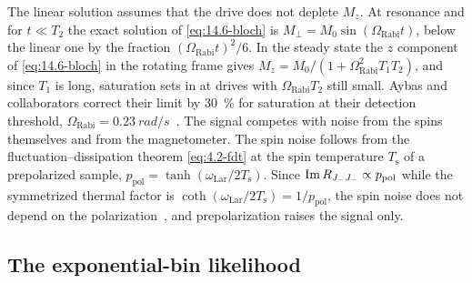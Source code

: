 The linear solution assumes that the drive does not deplete $M_z$. At resonance and for $t \ll T_2$ the exact solution of \cref{eq:14.6-bloch} is $M_\perp = M_0\sin(\Omega_{\mathrm{Rabi}}t)$, below the linear one by the fraction $(\Omega_{\mathrm{Rabi}}t)^2/6$. In the steady state the $z$ component of \cref{eq:14.6-bloch} in the rotating frame gives $M_z = M_0/(1 + \Omega_{\mathrm{Rabi}}^2T_1T_2)$, and since $T_1$ is long, saturation sets in at drives with $\Omega_{\mathrm{Rabi}}T_2$ still small. Aybas and collaborators correct their limit by \SI{30}{\percent} for saturation at their detection threshold, $\Omega_{\mathrm{Rabi}} = \SI{0.23}{rad/s}$~\cite[Sect.~III]{aybas2021search}. The signal competes with noise from the spins themselves and from the magnetometer. The spin noise follows from the fluctuation--dissipation theorem \cref{eq:4.2-fdt} at the spin temperature $T_{\mathrm{s}}$ of a prepolarized sample, $p_{\mathrm{pol}} = \tanh(\omega_{\mathrm{Lar}}/2T_{\mathrm{s}})$. Since $\operatorname{Im} R_{J_-J_-} \propto p_{\mathrm{pol}}$ while the symmetrized thermal factor is $\coth(\omega_{\mathrm{Lar}}/2T_{\mathrm{s}}) = 1/p_{\mathrm{pol}}$, the spin noise does not depend on the polarization~\cite[Eq.~(A1)]{budker2014proposal}, and prepolarization raises the signal only.

\subsection{The exponential-bin likelihood}\label{sec:14.6-stats}

